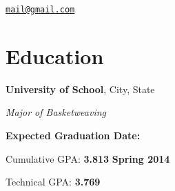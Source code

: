 \documentclass[margin,line]{resume}
\begin{document}

\begin{resume}

\vspace{-3mm}

\texttt{\href{mailto:email_address}{mail@gmail.com}}




 



\section{\mysidestyle Education}

\textbf{University of School}, City, State \vspace{0mm}\\\vspace{1mm}%

\textsl{Major of Basketweaving} \hfill

\textbf{Expected Graduation Date:} \vspace{-3mm}\\\vspace{-1mm}%

\begin{list2}

\item Cumulative GPA: \textbf{3.813} \hfill \textbf{Spring 2014 \hspace{3mm} }

\item Technical GPA: \textbf{3.769}



\end{list2}\vspace{-1.5mm}


\end{resume}
\end{document}
